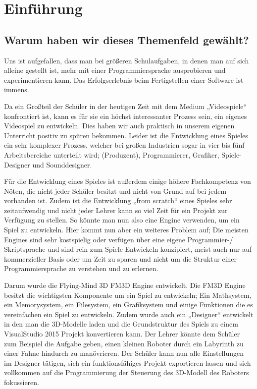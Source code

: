 
\chapter{Einführung}
\label{c:einführung}
\setcounter{page}{1}
\section[Warum dieses Themenfeld?]{Warum haben wir dieses Themenfeld gewählt?}

Uns ist aufgefallen, dass man bei größeren Schulaufgaben, in denen man auf sich alleine gestellt ist, mehr mit einer Programmiersprache ausprobieren und experimentieren kann. Das Erfolgserlebnis beim Fertigstellen einer Software ist immens. 

Da ein Großteil der Schüler in der heutigen Zeit mit dem Medium „Videospiele“ konfrontiert ist, kann es für sie ein höchst interessanter Prozess sein, ein eigenes Videospiel zu entwickeln. Dies haben wir auch praktisch in unserem eigenen Unterricht positiv zu spüren bekommen.
Leider ist die Entwicklung eines Spieles ein sehr komplexer Prozess, welcher bei großen Industrien sogar in vier bis fünf Arbeitsbereiche unterteilt wird; (Produzent), Programmierer, Grafiker, Spiele-Designer und Sounddesigner.  \cite{gea}

Für die Entwicklung eines Spieles ist außerdem einige höhere Fachkompetenz von Nöten, die nicht jeder Schüler besitzt und nicht von Grund auf bei jedem vorhanden ist. Zudem ist die Entwicklung „from scratch“ eines Spieles sehr zeitaufwendig und nicht jeder Lehrer kann so viel Zeit für ein Projekt zur Verfügung zu stellen. 
So könnte man nun also eine Engine verwenden, um ein Spiel zu entwickeln. Hier kommt nun aber ein weiteres Problem auf; Die meisten Engines sind sehr kostspielig oder verfügen über eine eigene Programmier-/ Skriptsprache und sind rein zum Spiele-Entwickeln konzipiert, meist auch nur auf kommerzieller Basis oder um Zeit zu sparen und nicht um die Struktur einer Programmiersprache zu verstehen und zu erlernen.

Darum wurde die Flying-Mind 3D \ac{FM3D} Engine entwickelt. Die FM3D Engine besitzt die wichtigsten Komponente um ein Spiel zu entwickeln;  Ein Mathsystem, ein Memorysystem, ein Filesystem, ein Grafiksystem und einige Funktionen die es vereinfachen ein Spiel zu entwickeln.
Zudem wurde auch ein „Designer“ entwickelt in den man die 3D-Modelle laden und die Grundstruktur des Spiels zu einem VisualStudio 2015 Projekt konvertieren kann.
Der Lehrer könnte dem Schüler zum Beispiel die Aufgabe geben, einen kleinen Roboter durch ein Labyrinth zu einer Fahne hindurch zu manövrieren. Der Schüler kann nun alle Einstellungen im Designer tätigen, sich ein funktionsfähiges Projekt exportieren lassen und sich vollkommen auf die Programmierung der Steuerung des 3D-Modell des Roboters fokussieren.

